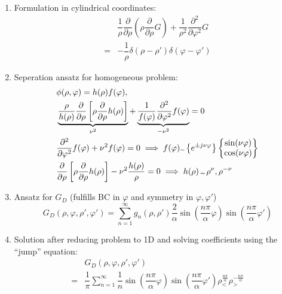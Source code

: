 \begin{enumerate}
  \item Formulation in cylindrical coordinates:
        \begin{align*}
          &\dfrac{1}{\rho} \dfrac{\partial}{\partial\rho}\left(\rho \dfrac{\partial}{\partial\rho}G\right)
          + \dfrac{1}{\rho^{2}}\dfrac{\partial^{2}}{\partial \varphi^{2}}G\\
          = &-\dfrac{1}{\rho} \delta(\rho - \rho') \delta(\varphi - \varphi')
        \end{align*}
  \item Seperation ansatz for homogeneous problem:
        \begin{align*}
          &\phi(\rho, \varphi) = h(\rho) f(\varphi),\\
          &\underbrace{\dfrac{\rho}{h(\rho)} \dfrac{\partial}{\partial\rho} \left[\rho \dfrac{\partial}{\partial\rho} h(\rho)\right]}_{\nu^{2}}
            + \underbrace{\dfrac{1}{f(\varphi)} \dfrac{\partial^{2}}{\partial\varphi^{2}} f(\varphi)}_{-\nu^{2}}
            = 0\\
          & \dfrac{\partial^{2}}{\partial\varphi^{2}}f(\varphi) + \nu^{2}f(\varphi) = 0
            \implies f(\varphi) \text{\texttildelow} \left\{e^{\pm j\nu \varphi}\right\}
          \begin{Bmatrix} \sin(\nu\varphi)\\ \cos(\nu\varphi) \end{Bmatrix}\\
          & \dfrac{\partial}{\partial\rho} \left[\rho \dfrac{\partial}{\partial\rho} h(\rho)\right] - \nu^{2}\dfrac{h(\rho)}{\rho} = 0
            \implies h(\rho) \, \text{\texttildelow} \, \rho^{\nu}, \rho^{-\nu}
        \end{align*}
  \item Ansatz for $G_{D}$ (fulfills BC in $\varphi$ and symmetry in $\varphi, \varphi'$)
        \begin{equation*}
          G_{D}(\rho, \varphi, \rho', \varphi') = \sum\limits_{n=1}^{\infty} g_{n}(\rho, \rho')
          \dfrac{2}{\alpha}
          \sin\left(\dfrac{n\pi}{\alpha} \varphi\right)
          \sin\left(\dfrac{n\pi}{\alpha} \varphi'\right)
        \end{equation*}
  \item Solution after reducing problem to 1D and solving coefficients using the ``jump'' equation:
        \begin{align*}
          &G_{D}(\rho, \varphi, \rho', \varphi')\\
          = &\dfrac{1}\pi \sum\limits_{n=1}^{\infty} \dfrac{1}{n}
          \sin\left(\dfrac{n\pi}{\alpha} \varphi\right)
          \sin\left(\dfrac{n\pi}{\alpha} \varphi'\right)
          \rho_{<}^{\frac{n\pi}{\alpha}}
          \rho_{>}^{-\frac{n\pi}{\alpha}}
        \end{align*}
\end{enumerate}


